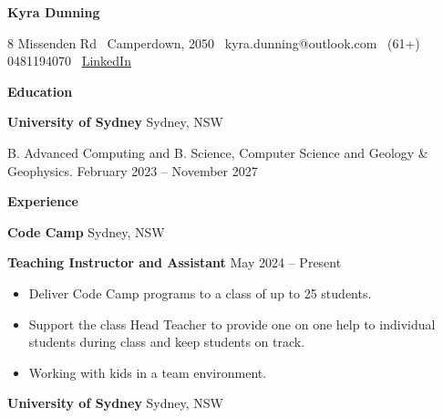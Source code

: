 \documentclass[11pt]{article}
\begin{document}
\begin{center}
    \textbf{Kyra Dunning}\\ 
    \hrulefill
\end{center}

\begin{center}
    8 Missenden Rd \textbullet \ Camperdown, 2050 \textbullet \ kyra.dunning@outlook.com \textbullet \ (61+) 0481194070 \textbullet \ \href{https://www.linkedin.com/in/kyra-dunning/}{LinkedIn}
\end{center}

\vspace{0.5pt}

\begin{center}
    \textbf{Education}\\
    \hrulefill
\end{center}
\textbf{University of Sydney} \hfill Sydney, NSW

B. Advanced Computing and B. Science,  
Computer Science and Geology \& Geophysics.
\hfill February 2023 – November 2027

\vspace{12pt}


\begin{center}
    \textbf{Experience}\\ 
    \hrulefill
\end{center}

\textbf{Code Camp} \hfill Sydney, NSW

\textbf{Teaching Instructor and Assistant} \hfill May 2024 – Present
\begin{itemize}[noitemsep, topsep=0pt, partopsep=0pt, parsep=0pt]
    \item Deliver Code Camp programs to a class of up to 25 students.
    \item Support the class Head Teacher to provide one on one help to individual students during class and keep students on track.
    \item Working with kids in a team environment.
\end{itemize}

\vspace{12pt}

\textbf{University of Sydney} \hfill Sydney, NSW
\end{document}
